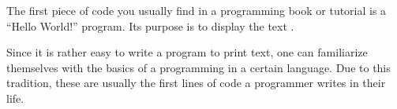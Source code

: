 
The first piece of code you usually find in a programming book or
tutorial is a ``Hello World!'' program. Its purpose is to display the
text .

Since it is rather easy to write a program to print text, one can
familiarize themselves with the basics of a programming in a certain
language. Due to this tradition, these are usually the first lines of
code a programmer writes in their life.
